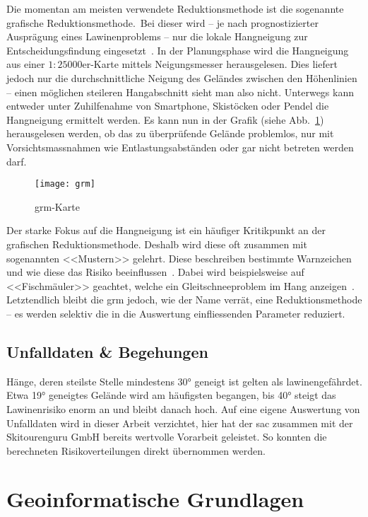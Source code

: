 Die momentan am meisten verwendete Reduktionsmethode ist die sogenannte grafische Reduktionsmethode.\ Bei dieser wird -- je nach prognostizierter Ausprägung eines Lawinenproblems -- nur die lokale Hangneigung zur Entscheidungsfindung eingesetzt~\cite{sacbergspwinter}. In der Planungsphase wird die Hangneigung aus einer $1:25000$er-Karte mittels Neigungsmesser herausgelesen. Dies liefert jedoch nur die durchschnittliche Neigung des Geländes zwischen den Höhenlinien -- einen möglichen steileren Hangabschnitt sieht man also nicht.
Unterwegs kann entweder unter Zuhilfenahme von Smartphone, Skistöcken oder Pendel die Hangneigung ermittelt werden. Es kann nun in der Grafik (siehe Abb.\ \ref{fig:grm}) herausgelesen werden, ob das zu überprüfende Gelände problemlos, nur mit Vorsichtsmassnahmen wie Entlastungsabständen oder gar nicht betreten werden darf.
\begin{figure}[H]
  \centering
  \texttt{[image: grm]}
  \caption{\gls{grm}-Karte~\cite{achtunglawine}}\label{fig:grm}
\end{figure}

Der starke Fokus auf die Hangneigung ist ein häufiger Kritikpunkt an der grafischen Reduktionsmethode. Deshalb wird diese oft zusammen mit sogenannten <<Mustern>> gelehrt. Diese beschreiben bestimmte Warnzeichen und wie diese das Risiko beeinflussen~\cite{achtunglawine}. Dabei wird beispielsweise auf <<Fischmäuler>> geachtet, welche ein Gleitschneeproblem im Hang anzeigen~\cite{harveyrhynerschweizerlawinenkunde}. Letztendlich bleibt die \gls{grm} jedoch, wie der Name verrät, eine Reduktionsmethode -- es werden selektiv die in die Auswertung einfliessenden Parameter reduziert.

\subsection{Unfalldaten \& Begehungen}

Hänge, deren steilste Stelle mindestens 30° geneigt ist gelten als lawinengefährdet. Etwa 19° geneigtes Gelände wird am häufigsten begangen, bis 40° steigt das Lawinenrisiko enorm an und bleibt danach hoch. Auf eine eigene Auswertung von Unfalldaten wird in dieser Arbeit verzichtet, hier hat der \acrfull{sac} zusammen mit der Skitourenguru GmbH bereits wertvolle Vorarbeit geleistet. So konnten die berechneten Risikoverteilungen direkt übernommen werden.~\cite{sacbergspwinterp99} 


\clearpage
\section{Geoinformatische Grundlagen}

